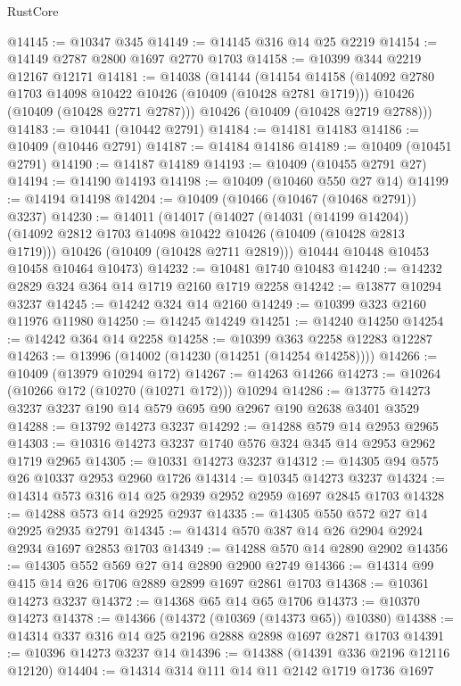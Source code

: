 \begin{lexlean}{RustCore}
\begin{coremodule}
@14145 := @10347 @345
@14149 := @14145 @316 @14 @25 @2219
@14154 := @14149 @2787 @2800 @1697 @2770 @1703
@14158 := @10399 @344 @2219 @12167 @12171
@14181 := @14038
    (@14144
      (@14154
        @14158
        (@14092 @2780 @1703 @14098 @10422 @10426 (@10409 (@10428 @2781 @1719)))
        @10426
        (@10409 (@10428 @2771 @2787)))
      @10426
      (@10409 (@10428 @2719 @2788)))
@14183 := @10441 (@10442 @2791)
@14184 := @14181 @14183
@14186 := @10409 (@10446 @2791)
@14187 := @14184 @14186
@14189 := @10409 (@10451 @2791)
@14190 := @14187 @14189
@14193 := @10409 (@10455 @2791 @27)
@14194 := @14190 @14193
@14198 := @10409 (@10460 @550 @27 @14)
@14199 := @14194 @14198
@14204 := @10409 (@10466 (@10467 (@10468 @2791)) @3237)
@14230 := @14011
    (@14017
      (@14027
        (@14031 (@14199 @14204))
        (@14092 @2812 @1703 @14098 @10422 @10426 (@10409 (@10428 @2813 @1719)))
        @10426
        (@10409 (@10428 @2711 @2819)))
      @10444
      @10448
      @10453
      @10458
      @10464
      @10473)
@14232 := @10481 @1740 @10483
@14240 := @14232 @2829 @324 @364 @14 @1719 @2160 @1719 @2258
@14242 := @13877 @10294 @3237
@14245 := @14242 @324 @14 @2160
@14249 := @10399 @323 @2160 @11976 @11980
@14250 := @14245 @14249
@14251 := @14240 @14250
@14254 := @14242 @364 @14 @2258
@14258 := @10399 @363 @2258 @12283 @12287
@14263 := @13996 (@14002 (@14230 (@14251 (@14254 @14258))))
@14266 := @10409 (@13979 @10294 @172)
@14267 := @14263 @14266
@14273 := @10264 (@10266 @172 (@10270 (@10271 @172))) @10294
@14286 := @13775 @14273 @3237 @3237 @190 @14 @579 @695 @90 @2967 @190 @2638 @3401 @3529
@14288 := @13792 @14273 @3237
@14292 := @14288 @579 @14 @2953 @2965
@14303 := @10316 @14273 @3237 @1740 @576 @324 @345 @14 @2953 @2962 @1719 @2965
@14305 := @10331 @14273 @3237
@14312 := @14305 @94 @575 @26 @10337 @2953 @2960 @1726
@14314 := @10345 @14273 @3237
@14324 := @14314 @573 @316 @14 @25 @2939 @2952 @2959 @1697 @2845 @1703
@14328 := @14288 @573 @14 @2925 @2937
@14335 := @14305 @550 @572 @27 @14 @2925 @2935 @2791
@14345 := @14314 @570 @387 @14 @26 @2904 @2924 @2934 @1697 @2853 @1703
@14349 := @14288 @570 @14 @2890 @2902
@14356 := @14305 @552 @569 @27 @14 @2890 @2900 @2749
@14366 := @14314 @99 @415 @14 @26 @1706 @2889 @2899 @1697 @2861 @1703
@14368 := @10361 @14273 @3237
@14372 := @14368 @65 @14 @65 @1706
@14373 := @10370 @14273
@14378 := @14366 (@14372 (@10369 (@14373 @65)) @10380)
@14388 := @14314 @337 @316 @14 @25 @2196 @2888 @2898 @1697 @2871 @1703
@14391 := @10396 @14273 @3237 @14
@14396 := @14388 (@14391 @336 @2196 @12116 @12120)
@14404 := @14314 @314 @111 @14 @11 @2142 @1719 @1736 @1697

\end{coremodule}
\end{lexlean}
